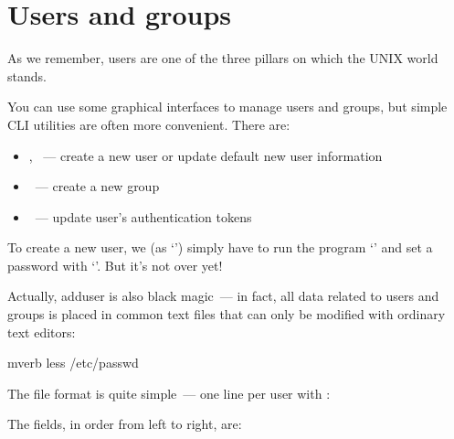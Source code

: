\section*{Users and groups} %

As we remember, users are one of the three pillars on which the UNIX world stands.

You can use some graphical interfaces to manage users and groups, but simple CLI utilities are often more convenient. There are:
\begin{itemize}
\item {}, ~--- create a new user or update default
      new user information
\item {}~--- create a new group
\item {}~--- update user’s authentication tokens
\end{itemize}

To create a new user, we (as `') simply have to run the program
`' and set a password with `'. But it's not over yet!

Actually, adduser is also black magic~--- in fact, all data related to users
and groups is placed in common text files that can only be modified
with ordinary text editors:
\begin{code}{mverb}
less /etc/passwd
\end{code}
The file format is quite simple~--- one line per user
with :
The fields, in order from left to right, are:

